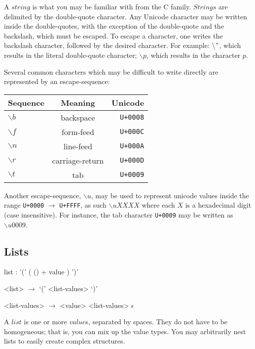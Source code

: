 \documentclass[a4paper]{article}
\begin{document}
A $string$ is what you may be familiar with from the C family. $Strings$ are delimited by the double-quote character. Any Unicode character may be written inside the double-quotes, with the exception of the double-quote and the backslash, which must be escaped. To escape a character, one writes the backslash character, followed by the desired character. For example: $\backslash "$, which results in the literal double-quote character; $\backslash p$, which results in the character $p$.

Several common characters which may be difficult to write directly are represented by an escape-sequence:

\begin{center}
\begin{tabular}{l c r}
	Sequence	   & Meaning		 & Unicode \\
	\hline
	$\backslash b$ & backspace		 & \texttt{U+0008} \\
	$\backslash f$ & form-feed		 & \texttt{U+000C} \\
	$\backslash n$ & line-feed		 & \texttt{U+000A} \\
	$\backslash r$ & carriage-return & \texttt{U+000D} \\
	$\backslash t$ & tab			 & \texttt{U+0009}
\end{tabular}
\end{center}

Another escape-sequence, $\backslash u$, may be used to represent unicode values inside the range \texttt{U+0000} $\to$ \texttt{U+FFFF}, as such $\backslash u XXXX$ where each $X$ is a hexadecimal digit (case insensitive). For instance, the tab character \texttt{U+0009} may be written as $\backslash u 0009$.

\subsection{Lists}
\begin{rail}
	list : '(' ( () + value ) ')'
\end{rail}

\begin{grammar}
	<list> $\to$ `(' <list-values> `)'

	<list-values> $\to$ <value> <list-values>
		\alt $\epsilon$
\end{grammar}

A $list$ is one or more $value$s, separated by spaces. They do not have to be homogeneous; that is, you can mix up the value types. You may arbitrarily nest lists to easily create complex structures.
\end{document}
